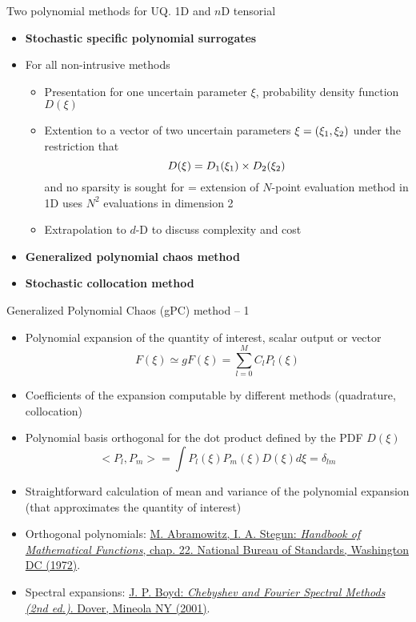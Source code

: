 \documentclass[10pt]{beamer}
\def\vo{\vspace{1mm}}
\def\vt{\vspace{2mm}}
\def\vr{\vspace{3mm}}
\def\vs{\vspace{7mm}}
\def\begit{\begin{itemize}}
\def\endit{\end{itemize}}
\begin{document}
%
\begin{frame}{Two polynomial methods for UQ. 1D and $n$D tensorial}
%
\footnotesize{
\begit
\item {\bf Stochastic specific polynomial surrogates}

\item For all non-intrusive methods
\vt
  \begit
  \item Presentation for one uncertain parameter $\xi$, probability density function $D(\xi)$
  \vo
  \item Extention to a vector of  two uncertain parameters ${\bf \xi}=(\xi_1,\xi_2)$ under the restriction that
 $$ D({\bf \xi})=D_1(\xi_1)\times D_2(\xi_2) $$
  and no sparsity is sought for = extension of $N$-point evaluation  method in 1D uses $N^2$ evaluations in dimension 2
  \vr
  \item Extrapolation to $d$-D to discuss complexity and cost 
  \endit
\vs
\item {\bf Generalized polynomial chaos method}
\vr
\item {\bf Stochastic collocation method}
\endit }
%
\end{frame}
%
%
\begin{frame}{Generalized Polynomial Chaos (gPC) method -- 1}

\footnotesize{
\begit
\item Polynomial expansion of the quantity of interest, scalar output or vector 
%
 $$ F(\xi) \simeq gF(\xi) = \sum_{l=0}^{M} C_l P_l(\xi)$$
%
\item Coefficients of the expansion computable by different methods (quadrature,
 collocation)
\item Polynomial basis orthogonal for the dot product defined by the PDF $D(\xi)$
  $$  <P_l,P_m> = \int P_l(\xi) P_m(\xi) D(\xi) d\xi = \delta_{lm}$$
\item Straightforward calculation of mean and variance of the polynomial expansion (that approximates the
 quantity of interest)
\vs
\item Orthogonal polynomials: \href{http://people.math.sfu.ca/~cbm/aands/}{M. Abramowitz, I. A. Stegun: \emph{Handbook of Mathematical Functions}, chap. 22. National Bureau of Standards, Washington DC (1972)}.
\item Spectral expansions: \href{https://store.doverpublications.com/0486411834.html}{J. P. Boyd: \emph{Chebyshev and Fourier Spectral Methods (2nd ed.)}. Dover, Mineola NY (2001)}. 
\endit
}
%
\end{frame}
\end{document}

